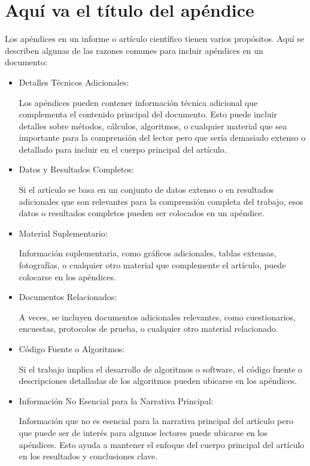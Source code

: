 \documentclass[spanish,notitlepage,letterpaper,11pt]{article} %
\begin{document}
\section{Aquí va el título del apéndice}
Los apéndices en un informe o artículo científico tienen varios propósitos. Aquí se describen algunas de las razones comunes para incluir apéndices en un documento:
\begin{itemize}
\item Detalles Técnicos Adicionales:

Los apéndices pueden contener información técnica adicional que complementa el contenido principal del documento. Esto puede incluir detalles sobre métodos, cálculos, algoritmos, o cualquier material que sea importante para la comprensión del lector pero que sería demasiado extenso o detallado para incluir en el cuerpo principal del artículo.

\item Datos y Resultados Completos:

Si el artículo se basa en un conjunto de datos extenso o en resultados adicionales que son relevantes para la comprensión completa del trabajo, esos datos o resultados completos pueden ser colocados en un apéndice.

\item Material Suplementario:

Información suplementaria, como gráficos adicionales, tablas extensas, fotografías, o cualquier otro material que complemente el artículo, puede colocarse en los apéndices.

\item Documentos Relacionados:

A veces, se incluyen documentos adicionales relevantes, como cuestionarios, encuestas, protocolos de prueba, o cualquier otro material relacionado.

\item Código Fuente o Algoritmos:

Si el trabajo implica el desarrollo de algoritmos o software, el código fuente o descripciones detalladas de los algoritmos pueden ubicarse en los apéndices.

\item Información No Esencial para la Narrativa Principal:

Información que no es esencial para la narrativa principal del artículo pero que puede ser de interés para algunos lectores puede ubicarse en los apéndices. Esto ayuda a mantener el enfoque del cuerpo principal del artículo en los resultados y conclusiones clave.
\end{itemize}
\end{document}

